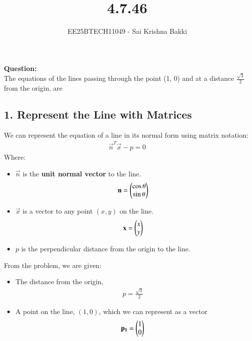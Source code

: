 \documentclass[journal]{IEEEtran}
\begin{document}

\vspace{3cm}

\title{4.7.46}
\author{EE25BTECH11049 - Sai Krishna Bakki}
 \maketitle
{\let\newpage\relax\maketitle}

\renewcommand{\thefigure}{\theenumi}
\renewcommand{\thetable}{\theenumi}
\setlength{\intextsep}{10pt} %


\renewcommand{\thetable}{\theenumi}
\textbf{Question:}\\
The equations of the lines passing through the point (1, 0) and at a distance $\frac{\sqrt{3}}{2}$ from the origin, are \\

\solution
\subsection*{1. Represent the Line with Matrices}

We can represent the equation of a line in its normal form using matrix notation:
\begin{align}
\vec{n}^T \vec{x} - p = 0
\end{align} 
Where:
\begin{itemize}
    \item $\vec{n}$ is the \textbf{unit normal vector} to the line. \begin{align}\mathbf{n} = \begin{pmatrix}\cos\theta \\ \sin\theta\end{pmatrix}\end{align} 
    \item $\vec{x}$ is a vector to any point $(x, y)$ on the line. \begin{align}\mathbf{x} = \begin{pmatrix}x \\ y\end{pmatrix}\end{align} 
    \item $p$ is the perpendicular distance from the origin to the line.
\end{itemize}
From the problem, we are given:
\begin{itemize}
    \item The distance from the origin, \begin{align}p = \frac{\sqrt{3}}{2}\end{align} 
    \item A point on the line, $(1, 0)$, which we can represent as a vector \begin{align}\mathbf{p_1} = \begin{pmatrix}1 \\ 0\end{pmatrix}\end{align} 
\end{itemize}
\end{document}
